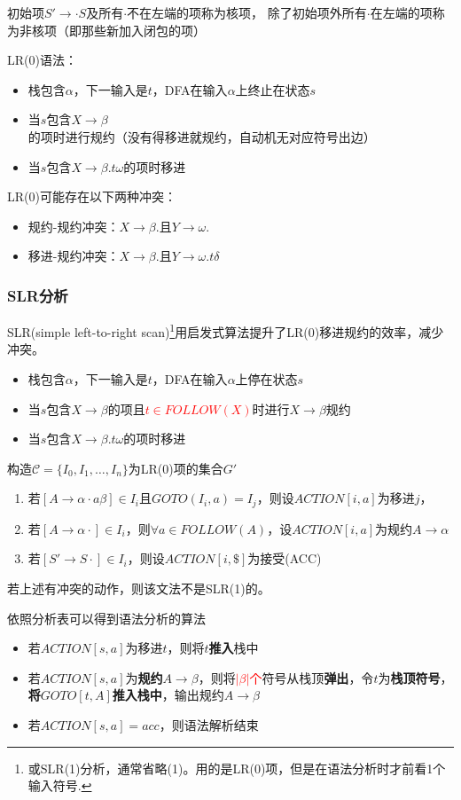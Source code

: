 \begin{definition}
初始项$S'\to\cdot S$及所有$\cdot$不在左端的项称为核项，
除了初始项外所有$\cdot$在左端的项称为非核项（即那些新加入闭包的项）
\end{definition}

LR(0)语法：
\begin{itemize}
	\item 栈包含$\alpha$，下一输入是$t$，DFA在输入$\alpha$上终止在状态$s$
	\item 当$s$包含$X\to\beta$的项时进行规约（没有得移进就规约，自动机无对应符号出边）
	\item 当$s$包含$X\to\beta.t\omega$的项时移进
\end{itemize}

LR(0)可能存在以下两种冲突：
\begin{itemize}
	\item 规约-规约冲突：$X\to\beta.$且$Y\to\omega.$
	\item 移进-规约冲突：$X\to\beta.$且$Y\to\omega.t\delta$
\end{itemize}

\subsubsection{SLR分析}
SLR(simple left-to-right scan)\footnote{或SLR(1)分析，通常省略(1)。用的是LR(0)项，但是在语法分析时才前看1个输入符号.}用启发式算法提升了LR(0)移进规约的效率，减少冲突。
\begin{itemize}
	\item 栈包含$\alpha$，下一输入是$t$，DFA在输入$\alpha$上停在状态$s$
	\item 当$s$包含$X\to\beta$的项且\textcolor{red}{$t\in FOLLOW(X)$}时进行$X\to\beta$规约
	\item 当$s$包含$X\to\beta.t\omega$的项时移进
\end{itemize}

\begin{myalgorithm}
构造$\mathcal{C}=\{I_0,I_1,\ldots,I_n\}$为LR(0)项的集合$G'$
\begin{enumerate}
	\item 若$[A\to\alpha\cdot a \beta]\in I_i$且$GOTO(I_i,a)=I_j$，则设$ACTION[i,a]$为移进$j$，
	\item 若$[A\to\alpha\cdot]\in I_i$，则$\forall a\in FOLLOW(A)$，设$ACTION[i,a]$为规约$A\to\alpha$
	\item 若$[S'\to S\cdot]\in I_i$，则设$ACTION[i,\$]$为接受(ACC)
\end{enumerate}
若上述有冲突的动作，则该文法不是SLR(1)的。

依照分析表可以得到语法分析的算法
\begin{itemize}
	\item 若$ACTION[s,a]$为移进$t$，则将$t$\textbf{推入}栈中
	\item 若$ACTION[s,a]$为\textbf{规约$A\to\beta$}，则将\textcolor{red}{$|\beta|$个}符号从栈顶\textbf{弹出}，令$t$为\textbf{栈顶符号}，\textbf{将$GOTO[t,A]$推入栈中}，输出规约$A\to\beta$
	\item 若$ACTION[s,a]=acc$，则语法解析结束
\end{itemize}
\end{myalgorithm}

